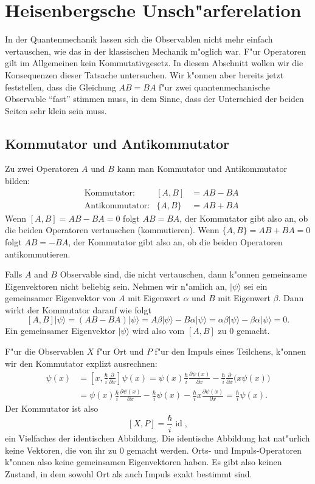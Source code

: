 \chapter{Heisenbergsche Unsch"arferelation\label{chapter:heisenberg}}
\rhead{}

In der Quantenmechanik lassen sich die Observablen nicht mehr einfach
vertauschen, wie das in der klassischen Mechanik m"oglich war.
F"ur Operatoren gilt im Allgemeinen kein Kommutativgesetz.
In diesem Abschnitt wollen wir die Konsequenzen dieser Tatsache
untersuchen.
Wir k"onnen aber bereits jetzt feststellen, dass die Gleichung
$AB=BA$ f"ur zwei quantenmechanische Observable ``fast'' stimmen
muss, in dem Sinne, dass der Unterschied der beiden Seiten sehr
klein sein muss. 

\section{Kommutator und Antikommutator}
Zu zwei Operatoren $A$ und $B$ kann man Kommutator und Antikommutator
bilden:
\begin{align*}
&\text{Kommutator:}&
[A,B]&=AB-BA
\\
&\text{Antikommutator:}&
\{A,B\}&=AB+BA
\end{align*}
Wenn $[A,B]=AB-BA=0$ folgt $AB=BA$,
der Kommutator gibt also an, ob die beiden Operatoren vertauschen (kommutieren).
Wenn $\{A,B\}=AB+BA=0$ folgt $AB=-BA$,
der Kommutator gibt also an, ob die beiden Operatoren antikommutieren.

Falls $A$ and $B$ Observable sind, die nicht vertauschen, dann k"onnen
gemeinsame Eigenvektoren nicht beliebig sein.
Nehmen wir n"amlich an, $|\psi\rangle$ sei ein gemeinsamer Eigenvektor
von $A$ mit Eigenwert $\alpha$ und $B$ mit Eigenwert $\beta$.
Dann wirkt der Kommutator darauf wie folgt
\[
[A,B]|\psi\rangle
=
(AB-BA)|\psi\rangle 
=
A\beta|\psi\rangle -B\alpha|\psi\rangle
=
\alpha\beta|\psi\rangle-\beta\alpha|\psi\rangle
=
0.
\]
Ein gemeinsamer Eigenvektor $|\psi\rangle$ wird also vom $[A,B]$
zu $0$ gemacht.

F"ur die Observablen $X$ f"ur Ort und $P$ f"ur den Impuls eines Teilchens,
k"onnen wir den Kommutator explizt ausrechnen:
\begin{align*}
[X,P]\psi(x)
&=
\left[
x,\frac{\hbar}{i}\frac{\partial}{\partial x}
\right]\psi(x)
=
\psi(x)\frac{\hbar}{i}\frac{\partial\psi(x)}{\partial x}
-
\frac{\hbar}{i}\frac{\partial}{\partial x}\biggl(x\psi(x)\biggr)
\\
&=
\psi(x)\frac{\hbar}{i}\frac{\partial\psi(x)}{\partial x}
-
\frac{\hbar}{i}\psi(x)
-
\frac{\hbar}{i}x\frac{\partial\psi(x)}{\partial x}
=
\frac{\hbar}{i}\psi(x).
\end{align*}
Der Kommutator ist also
\[
[X,P]=\frac{\hbar}{i}\operatorname{id},
\]
ein Vielfaches der identischen Abbildung.
Die identische Abbildung hat nat"urlich keine Vektoren, die von ihr
zu $0$ gemacht werden.
Orts- und Impuls-Operatoren k"onnen also keine gemeinsamen Eigenvektoren
haben.
Es gibt also keinen Zustand, in dem sowohl Ort als auch Impuls exakt
bestimmt sind.

